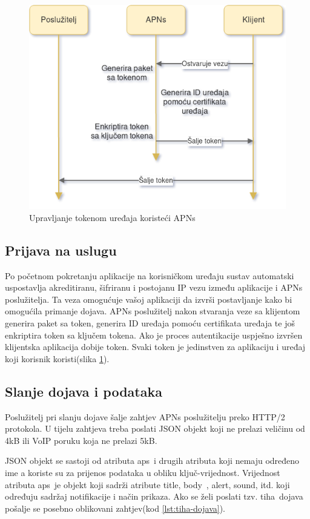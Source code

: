 \documentclass[times, utf8, zavrsni]{fer}
\begin{document}
\begin{figure}[htb]
\centering
\includegraphics[width=14cm]{img/apns.png}
\caption{Upravljanje tokenom uređaja koristeći APNs}
\label{fig:apns-image}
\end{figure}

\subsection{Prijava na uslugu}

Po početnom pokretanju aplikacije na korisničkom uređaju sustav automatski uspostavlja akreditiranu, šifriranu i postojanu IP vezu između aplikacije i APNs poslužitelja. Ta veza omogućuje vašoj aplikaciji da izvrši postavljanje kako bi omogućila primanje dojava. APNs poslužitelj nakon stvaranja veze sa klijentom generira paket sa token, generira ID uređaja pomoću certifikata uređaja te još enkriptira token sa ključem tokena. Ako je proces autentikacije uspješno izvršen klijentska aplikacija dobije token. Svaki token je jedinstven za aplikaciju i uređaj koji korisnik koristi(slika \ref{fig:apns-image}).
\subsection{Slanje dojava i podataka}

Poslužitelj pri slanju dojave šalje zahtjev APNs poslužitelju preko HTTP/2 protokola. U tijelu zahtjeva treba poslati JSON objekt koji ne prelazi veličinu od 4kB ili 	VoIP poruku koja ne prelazi 5kB.

JSON objekt se sastoji od atributa \glqq aps\grqq\  i drugih atributa koji nemaju određeno ime a koriste su za prijenos podataka u obliku ključ-vrijednost. Vrijednost atributa \glqq aps\grqq\  je objekt koji sadrži atribute \glqq title\grqq , \glqq body\grqq\ , \glqq alert\grqq , \glqq sound\grqq , itd. koji određuju sadržaj notifikacije i način prikaza. Ako se želi poslati tzv. \glqq tiha\grqq\  dojava pošalje se posebno oblikovani zahtjev(kod \ref{lst:tiha-dojava}).
\end{document}
